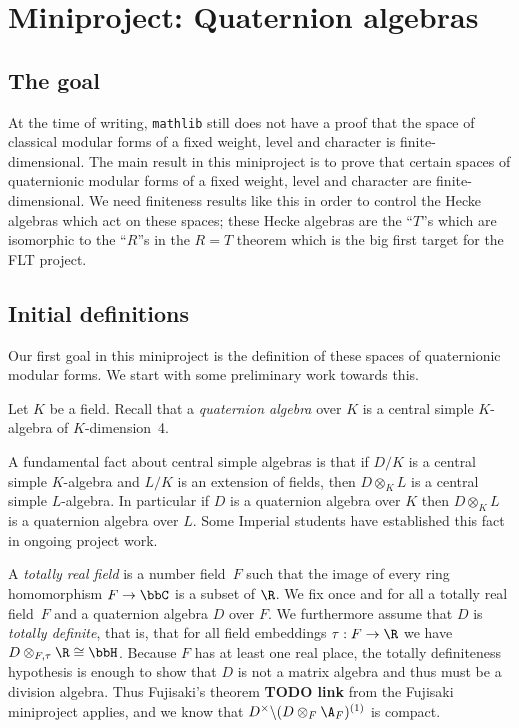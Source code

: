 \chapter{Miniproject: Quaternion algebras}\label{Quat_alg_project}

\section{The goal}

At the time of writing, {\tt mathlib} still does not have a proof that the space
of classical modular forms of a fixed weight, level and character is finite-dimensional.
The main result in this miniproject is to prove that certain spaces of quaternionic modular forms
of a fixed weight, level and character are finite-dimensional. We need finiteness results
like this in order to control the Hecke algebras which act on these spaces; these Hecke
algebras are the ``$T$''s which are isomorphic to the ``$R$''s in the $R=T$ theorem which
is the big first target for the FLT project.

\section{Initial definitions}

Our first goal in this miniproject is the definition of these spaces of quaternionic modular forms.
We start with some preliminary work towards this.

Let $K$ be a field. Recall that a \emph{quaternion algebra}
over $K$ is a central simple $K$-algebra of $K$-dimension~4.

A fundamental fact about central simple algebras is that if $D/K$
is a central simple $K$-algebra and $L/K$ is an extension of fields, then $D\otimes_KL$
is a central simple $L$-algebra. In particular if $D$ is a quaternion algebra over $K$
then $D\otimes_KL$ is a quaternion algebra over $L$. Some Imperial students have established
this fact in ongoing project work.

A \emph{totally real field} is a number field~$F$ such that the image of every ring
homomorphism $F\to\bbC$ is a subset of $\R$. We fix once and for all a totally real field~$F$ and a
quaternion algebra $D$ over $F$. We furthermore assume that $D$ is \emph{totally definite}, that is,
that for all field embeddings $\tau:F\to\R$ we have $D\otimes_{F,\tau}\R\cong\bbH$. Because $F$
has at least one real place, the totally definiteness hypothesis is enough to show that $D$
is not a matrix algebra and thus must be a division algebra. Thus Fujisaki's theorem {\bf TODO link}
from the Fujisaki miniproject applies, and we know that $D^\times\backslash (D\otimes_F\A_F)^{(1)}$
is compact.


